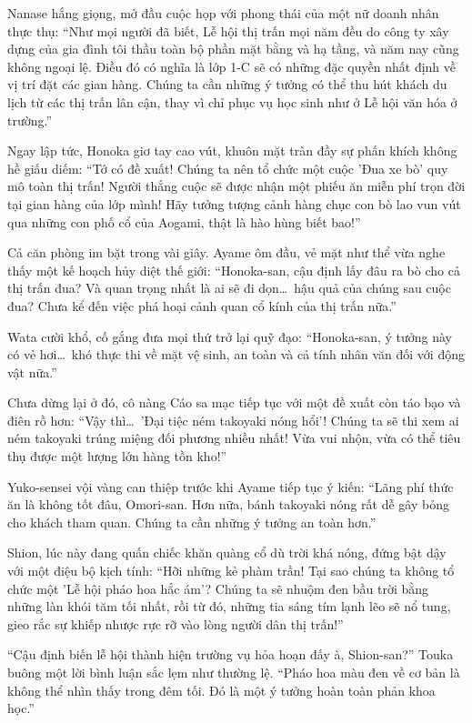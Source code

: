 \documentclass[../main.tex]{subfiles}
\begin{document}
Nanase hắng giọng, mở đầu cuộc họp với phong thái của một nữ doanh nhân thực thụ: ``Như mọi người đã biết, Lễ hội thị trấn mọi năm đều do công ty xây dựng của gia đình tôi thầu toàn bộ phần mặt bằng và hạ tầng, và năm nay cũng không ngoại lệ. Điều đó có nghĩa là lớp 1-C sẽ có những đặc quyền nhất định về vị trí đặt các gian hàng. Chúng ta cần những ý tưởng có thể thu hút khách du lịch từ các thị trấn lân cận, thay vì chỉ phục vụ học sinh như ở Lễ hội văn hóa ở trường.'' %

Ngay lập tức, Honoka giơ tay cao vút, khuôn mặt tràn đầy sự phấn khích không hề giấu diếm: ``Tớ có đề xuất! Chúng ta nên tổ chức một cuộc 'Đua xe bò' quy mô toàn thị trấn! Người thắng cuộc sẽ được nhận một phiếu ăn miễn phí trọn đời tại gian hàng của lớp mình! Hãy tưởng tượng cảnh hàng chục con bò lao vun vút qua những con phố cổ của Aogami, thật là hào hùng biết bao!''

Cả căn phòng im bặt trong vài giây. Ayame ôm đầu, vẻ mặt như thể vừa nghe thấy một kế hoạch hủy diệt thế giới: ``Honoka-san, cậu định lấy đâu ra bò cho cả thị trấn đua? Và quan trọng nhất là ai sẽ đi dọn\dots\ hậu quả của chúng sau cuộc đua? Chưa kể đến việc phá hoại cảnh quan cổ kính của thị trấn nữa.''

Wata cười khổ, cố gắng đưa mọi thứ trở lại quỹ đạo: ``Honoka-san, ý tưởng này có vẻ hơi\dots\ khó thực thi về mặt vệ sinh, an toàn và cả tính nhân văn đối với động vật nữa.''

Chưa dừng lại ở đó, cô nàng Cáo sa mạc tiếp tục với một đề xuất còn táo bạo và điên rồ hơn: ``Vậy thì\dots\ 'Đại tiệc ném takoyaki nóng hổi'! Chúng ta sẽ thi xem ai ném takoyaki trúng miệng đối phương nhiều nhất! Vừa vui nhộn, vừa có thể tiêu thụ được một lượng lớn hàng tồn kho!''

Yuko-sensei vội vàng can thiệp trước khi Ayame tiếp tục ý kiến: ``Lãng phí thức ăn là không tốt đâu, Omori-san. Hơn nữa, bánh takoyaki nóng rất dễ gây bỏng cho khách tham quan. Chúng ta cần những ý tưởng an toàn hơn.''

Shion, lúc này đang quấn chiếc khăn quàng cổ dù trời khá nóng, đứng bật dậy với một điệu bộ kịch tính: ``Hỡi những kẻ phàm trần! Tại sao chúng ta không tổ chức một 'Lễ hội pháo hoa hắc ám'? Chúng ta sẽ nhuộm đen bầu trời bằng những làn khói tăm tối nhất, rồi từ đó, những tia sáng tím lạnh lẽo sẽ nổ tung, gieo rắc sự khiếp nhược rực rỡ vào lòng người dân thị trấn!''

``Cậu định biến lễ hội thành hiện trường vụ hỏa hoạn đấy à, Shion-san?'' Touka buông một lời bình luận sắc lẹm như thường lệ. ``Pháo hoa màu đen về cơ bản là không thể nhìn thấy trong đêm tối. Đó là một ý tưởng hoàn toàn phản khoa học.''
\end{document}
